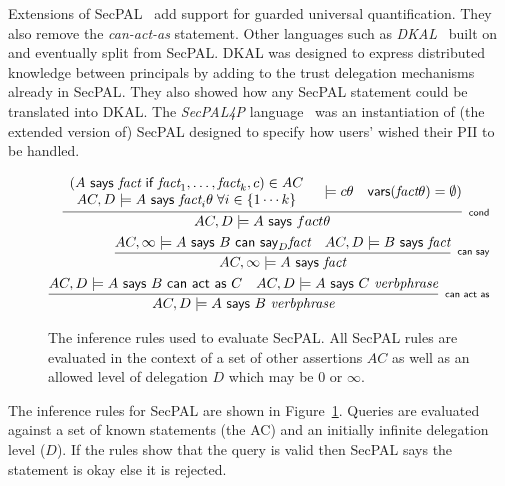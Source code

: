 \documentclass[a4paper]{article}
\begin{document}
Extensions of {SecPAL}~\cite{Becker:2009vt} add support for guarded
universal quantification. They also remove the \emph{can-act-as} statement. Other
languages such as \emph{DKAL}~\cite{Gurevich:2008fz} built on and eventually split
from {SecPAL}. DKAL was designed to express distributed knowledge between
principals by adding to the trust delegation mechanisms already in {SecPAL}.
They also showed how any {SecPAL} statement could be translated into {DKAL}.
The \emph{{SecPAL}4P} language~\cite{Becker:2009ula} was an instantiation of (the
extended version of) {SecPAL} designed to specify how users' wished their
\ac{PII} to be handled.

\begin{figure}
  \centering
  \begin{eqnarray*}
    \infer[\textsf{\scriptsize cond}]{%
      AC, D \models A\textsf{~says~}fact\theta
    }{%
      \begin{array}[c]{c}
        \left(A\textsf{~says~}\textit{fact}\textsf{~if~}\textit{fact}_1, \ldots, \textit{fact}_k, c\right) \in AC \\
        AC,D\models A\textsf{~says~}\textit{fact}_i\theta \; \forall i \in \{1\cdots k\}
      \end{array}
      & \models{c\theta}
      & \textsf{vars}(\textit{fact}\theta) = \emptyset)
    }\\
    \infer[\textsf{\scriptsize can say}]{%
      AC, \infty \models A\textsf{~says~}\textit{fact}
    }{%
      AC, \infty \models A\textsf{~says~}B\textsf{~can~say}_D \textit{fact}
      & AC, D \models B\textsf{~says~}\textit{fact}
    } \\
    \infer[\textsf{\scriptsize can act as}]{%
      AC, D \models A\textsf{~says~}B~\textit{verbphrase}
    }{%
      AC, D \models A\textsf{~says~}B\textsf{~can~act~as~}C
      & AC, D \models A\textsf{~says~}C~\textit{verbphrase}
    }
  \end{eqnarray*}
  \caption{The inference rules used to evaluate {SecPAL}. All {SecPAL} rules are
  evaluated in the context of a set of other assertions $AC$ as well as an
  allowed level of delegation $D$ which may be $0$ or $\infty$.}
\label{secpal:rules}
\end{figure}

The inference rules for SecPAL are shown in Figure~\ref{secpal:rules}. Queries
are evaluated against a set of known statements (the \ac{AC}) and an initially
infinite delegation level ($D$). If the rules show that the query is valid then
SecPAL says the statement is okay else it is rejected.
\end{document}
